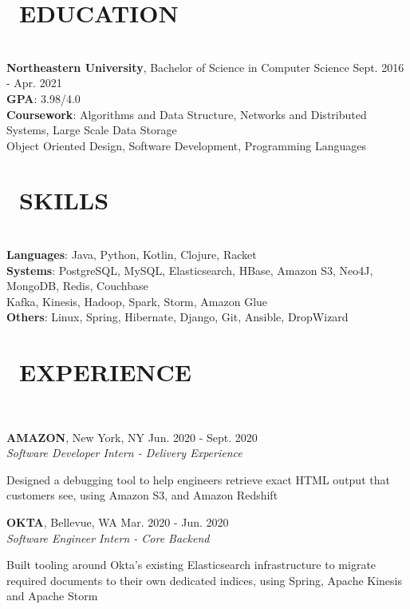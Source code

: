 \documentclass[11pt]{res}
\newcommand{\sectionunderline}{\vspace{-3mm}\hrulefill\\}
\newcommand{\listingtab}{\tabto{2.8cm}}
\newcommand{\newsect}[1]{\section{\Large \bf #1}}
\newcommand{\email}[1]{\faEnvelope\hspace{1mm} \href{mailto:#1}{#1}}
\newcommand{\github}[1]{\faGithubAlt\hspace{1mm} \href{https://github.com/#1}{#1}}
\newcommand{\linkedin}[1]{\faLinkedinSquare\hspace{1mm} \href{https://linkedin.com/in/#1}{#1}}
\begin{document}
\address{
  \large\email{derekpham67@gmail.com}\:
  \large{$\bullet$}
  \large\github{derekpham}\:
  \large{$\bullet$}
  \large\linkedin{derek-pham97}\\
}

\begin{resume}
  \newsect{\faGraduationCap\ EDUCATION}{
    \sectionunderline{
      {\bf Northeastern University}, Bachelor of Science in Computer Science \hfill Sept. 2016 - Apr. 2021\\
      {\bf GPA}: \listingtab 3.98/4.0\\
      {\bf Coursework}: \listingtab Algorithms and Data Structure, Networks and Distributed Systems, Large Scale Data Storage\\
      \listingtab Object Oriented Design, Software Development, Programming Languages
    }
  }

  \newsect{\faCogs\ SKILLS}{
    \sectionunderline{
      {\bf Languages}: \listingtab Java, Python, Kotlin, Clojure, Racket\\
      {\bf Systems}: \listingtab PostgreSQL, MySQL, Elasticsearch, HBase, Amazon S3, Neo4J, MongoDB, Redis, Couchbase\\
      \listingtab Kafka, Kinesis, Hadoop, Spark, Storm, Amazon Glue\\
      {\bf Others}: \listingtab Linux, Spring, Hibernate, Django, Git, Ansible, DropWizard
    }
  }

  \newsect{\faUsers\ EXPERIENCE}{
    \sectionunderline{
      {\bf AMAZON}, New York, NY \hfill Jun. 2020 - Sept. 2020\\
      {\it Software Developer Intern - Delivery Experience}
      \begin{itemize}
        {\item Designed a debugging tool to help engineers retrieve exact HTML output that customers see, using Amazon S3, and Amazon Redshift}
      \end{itemize}

      {\bf OKTA}, Bellevue, WA \hfill Mar. 2020 - Jun. 2020\\
      {\it Software Engineer Intern - Core Backend}
      \begin{itemize}
        {\item Built tooling around Okta's existing Elasticsearch infrastructure  to migrate required documents to their own dedicated indices, using Spring, Apache Kinesis and Apache Storm}
      \end{itemize}

}}
\end{resume}
\end{document}
